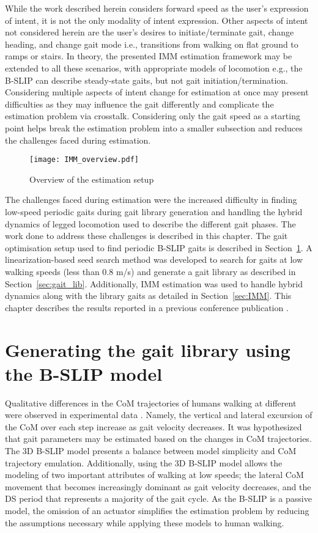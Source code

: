 While the work described herein considers forward speed as the user's expression of intent, it is not the only modality of intent expression. Other aspects of intent not considered herein are the user's desires to initiate/terminate gait, change heading, and change gait mode i.e., transitions from walking on flat ground to ramps or stairs. In theory, the presented IMM estimation framework may be extended to all these scenarios, with appropriate models of locomotion e.g., the B-SLIP can describe steady-state gaits, but not gait initiation/termination. Considering multiple aspects of intent change for estimation at once may present difficulties as they may influence the gait differently and complicate the estimation problem via crosstalk. Considering only the gait speed as a starting point helps break the estimation problem into a smaller subsection and reduces the challenges faced during estimation.

\begin{figure}
	\centering
	\texttt{[image: IMM\_overview.pdf]}
	\caption{Overview of the estimation setup}
	\vspace{-1em}
\end{figure}

The challenges faced during estimation were the increased difficulty in finding low-speed periodic gaits during gait library generation and handling the hybrid dynamics of legged locomotion used to describe the different gait phases. The work done to address these challenges is described in this chapter. The gait optimisation setup used to find periodic B-SLIP gaits is described in Section~\ref{sec:gait_opt}. A linearization-based seed search method was developed to search for gaits at low walking speeds (less than 0.8 m/s) and generate a gait library as described in Section~\ref{sec:gait_lib}. Additionally, IMM estimation was used to handle hybrid dynamics along with the library gaits as detailed in Section~\ref{sec:IMM}. This chapter describes the results reported in a previous conference publication \cite{karulkarapplication}.

\section{Generating the gait library using the B-SLIP model} \label{sec:gait_opt}

Qualitative differences in the CoM trajectories of humans walking at different were observed in experimental data \cite{fukuchi2018public}. Namely, the vertical and lateral excursion of the CoM over each step increase as gait velocity decreases. It was hypothesized that gait parameters may be estimated based on the changes in CoM trajectories. The 3D B-SLIP model presents a balance between model simplicity and CoM trajectory emulation. Additionally, using the 3D B-SLIP model allows the modeling of two important attributes of walking at low speeds; the lateral CoM movement that becomes increasingly dominant as gait velocity decreases, and the DS period that represents a majority of the gait cycle. As the B-SLIP is a passive model, the omission of an actuator simplifies the estimation problem by reducing the assumptions necessary while applying these models to human walking. 

